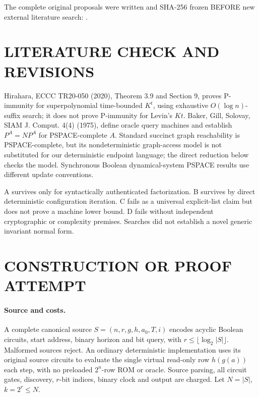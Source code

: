 \documentclass[11pt]{article}
\begin{document}
The complete original proposals were written and SHA-256 frozen BEFORE new external literature search: .

\section{LITERATURE CHECK AND REVISIONS}
Hirahara, ECCC TR20-050 (2020), Theorem 3.9 and Section 9, proves P-immunity for superpolynomial time-bounded $K^t$, using exhaustive $O(\log n)$-suffix search; it does not prove P-immunity for Levin's $Kt$. Baker, Gill, Solovay, SIAM J. Comput. 4(4) (1975), define oracle query machines and establish $P^A=NP^A$ for PSPACE-complete $A$. Standard succinct graph reachability is PSPACE-complete, but its nondeterministic graph-access model is not substituted for our deterministic endpoint language; the direct reduction below checks the model. Synchronous Boolean dynamical-system PSPACE results use different update conventions.

A survives only for syntactically authenticated factorization. B survives by direct deterministic configuration iteration. C fails as a universal explicit-list claim but does not prove a machine lower bound. D fails without independent cryptographic or complexity premises. Searches did not establish a novel generic invariant normal form.

\section{CONSTRUCTION OR PROOF ATTEMPT}
\paragraph{Source and costs.} A complete canonical source $S=(n,r,g,h,a_0,T,i)$ encodes acyclic Boolean circuits, start address, binary horizon and bit query, with $r\le\lfloor\log_2 |S|\rfloor$. Malformed sources reject. An ordinary deterministic implementation uses its original source circuits to evaluate the single virtual read-only row $h(g(a))$ each step, with no preloaded $2^n$-row ROM or oracle. Source parsing, all circuit gates, discovery, $r$-bit indices, binary clock and output are charged. Let $N=|S|$, $k=2^r\le N$.
\end{document}
